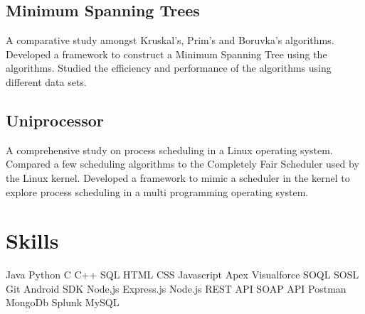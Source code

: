 \documentclass[]{prakhar-resume-version-2}
\begin{document}
\begin{minipage}[t]{0.33\textwidth}
\subsection{Minimum Spanning Trees}
\begin{justify}

\footnotesize{A comparative study amongst Kruskal's, Prim's and Boruvka's algorithms. Developed a framework to construct a Minimum Spanning Tree using the algorithms. Studied the efficiency and performance of the algorithms using different data sets.}
\end{justify}
\sectionsep

\subsection{Uniprocessor}
\begin{justify}

\footnotesize{A comprehensive study on process scheduling in a Linux operating system. Compared a few scheduling algorithms to the Completely Fair Scheduler used by the Linux kernel. Developed a framework to mimic a scheduler in the kernel to explore process scheduling in a multi programming operating system.}
\end{justify}
\sectionsep



\section{Skills}
Java \textbullet{}  Python \textbullet{} C \textbullet{} C++ \textbullet{} SQL \textbullet{} HTML \textbullet{} CSS \textbullet{}Javascript Apex \textbullet{} Visualforce \textbullet{} SOQL \textbullet{} SOSL \\ 
Git \textbullet{}  Android SDK \textbullet{} Node,js \textbullet{} Express.js \textbullet{} Node.js \textbullet{} REST API \textbullet{} SOAP API \textbullet{} Postman  \textbullet{} MongoDb \textbullet{} Splunk \textbullet{} MySQL \\
\sectionsep

%
%

\end{minipage} 
\hfill
\end{document}
